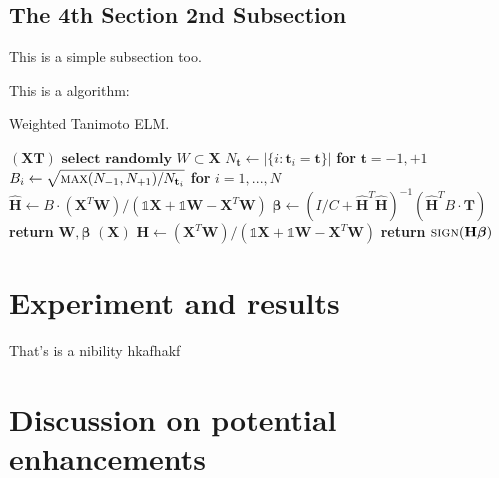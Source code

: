 \documentclass[lettersize,journal,12pt]{IEEEtran}
\begin{document}
\subsection{The 4th Section 2nd Subsection}

This is a simple subsection too.

This is a algorithm:

\begin{algorithm}[H]
	\caption{Weighted Tanimoto ELM.}\label{alg:alg1}
	\begin{algorithmic}
		\STATE
		$(\mathbf{X} \mathbf{T})$
		\STATE \hspace{0.5cm}$ \textbf{select randomly } W \subset \mathbf{X}  $
		\STATE \hspace{0.5cm}$ N_\mathbf{t} \gets | \{ i : \mathbf{t}_i = \mathbf{t} \} | $ \textbf{ for } $ \mathbf{t}= -1,+1 $
		\STATE \hspace{0.5cm}$ B_i \gets \sqrt{ \textsc{max}(N_{-1},N_{+1}) / N_{\mathbf{t}_i} } $ \textbf{ for } $ i = 1,...,N $
		\STATE \hspace{0.5cm}$ \hat{\mathbf{H}} \gets  B \cdot (\mathbf{X}^T\textbf{W})/( \mathbb{1}\mathbf{X} + \mathbb{1}\textbf{W} - \mathbf{X}^T\textbf{W} ) $
		\STATE \hspace{0.5cm}$ \boldsymbol{\beta} \gets \left ( I/C + \hat{\mathbf{H}}^T\hat{\mathbf{H}} \right )^{-1}(\hat{\mathbf{H}}^T B\cdot \mathbf{T})  $
		\STATE \hspace{0.5cm}\textbf{return}  $\textbf{W},  \boldsymbol{\beta} $
		\STATE
		$(\mathbf{X} )$
		\STATE \hspace{0.5cm}$ \mathbf{H} \gets  (\mathbf{X}^T\textbf{W} )/( \mathbb{1}\mathbf{X}  + \mathbb{1}\textbf{W}- \mathbf{X}^T\textbf{W}  ) $
		\STATE \hspace{0.5cm}\textbf{return}  $\textsc{sign}( \mathbf{H} \boldsymbol{\beta} )$
	\end{algorithmic}
	\label{alg1}
\end{algorithm}

\section{Experiment and results }

That's is a nibility hkafhakf

\section{Discussion on potential enhancements}
\end{document}
